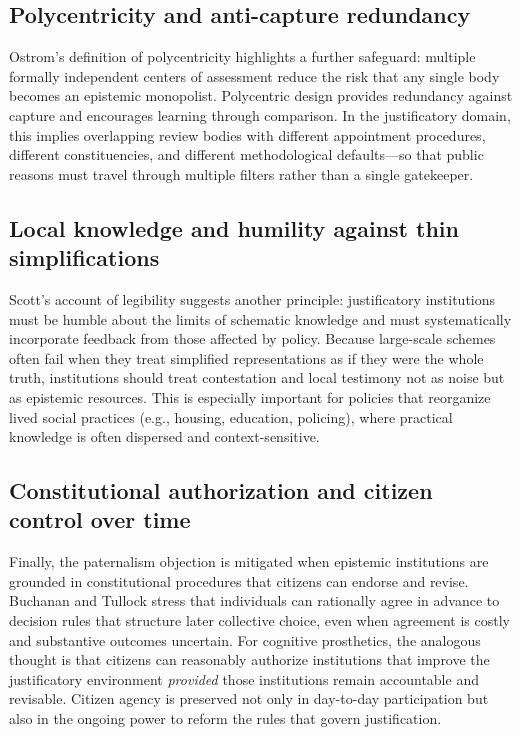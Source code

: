 \documentclass[12pt]{report}
\begin{document}
\subsection{Polycentricity and anti-capture redundancy}

Ostrom’s definition of polycentricity highlights a further safeguard: multiple formally independent centers of assessment reduce the risk that any single body becomes an epistemic monopolist. \parencite[p.~643]{ostrom2010polycentric}
Polycentric design provides redundancy against capture and encourages learning through comparison.
In the justificatory domain, this implies overlapping review bodies with different appointment procedures, different constituencies, and different methodological defaults---so that public reasons must travel through multiple filters rather than a single gatekeeper.

\subsection{Local knowledge and humility against thin simplifications}

Scott’s account of legibility suggests another principle: justificatory institutions must be humble about the limits of schematic knowledge and must systematically incorporate feedback from those affected by policy. \parencite[pp.~2--3]{scott1998seeing}
Because large-scale schemes often fail when they treat simplified representations as if they were the whole truth, institutions should treat contestation and local testimony not as noise but as epistemic resources. \parencite[p.~309]{scott1998seeing}
This is especially important for policies that reorganize lived social practices (e.g., housing, education, policing), where practical knowledge is often dispersed and context-sensitive.

\subsection{Constitutional authorization and citizen control over time}

Finally, the paternalism objection is mitigated when epistemic institutions are grounded in constitutional procedures that citizens can endorse and revise.
Buchanan and Tullock stress that individuals can rationally agree in advance to decision rules that structure later collective choice, even when agreement is costly and substantive outcomes uncertain. \parencite[pp.~6--7]{buchanan1962calculus}
For cognitive prosthetics, the analogous thought is that citizens can reasonably authorize institutions that improve the justificatory environment \emph{provided} those institutions remain accountable and revisable.
Citizen agency is preserved not only in day-to-day participation but also in the ongoing power to reform the rules that govern justification.
\end{document}
